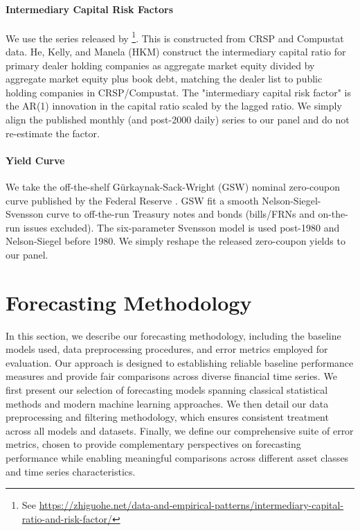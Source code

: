 \documentclass{article}
\begin{document}
\paragraph{Intermediary Capital Risk Factors}
We use the series released by \citet{He2017}\footnote{See \url{https://zhiguohe.net/data-and-empirical-patterns/intermediary-capital-ratio-and-risk-factor/}}. This is constructed from CRSP and Compustat data.
He, Kelly, and Manela (HKM) construct the intermediary capital ratio for primary dealer holding companies as aggregate market equity divided by aggregate market equity plus book debt, matching the dealer list to public holding companies in CRSP/Compustat. The "intermediary capital risk factor" is the AR(1) innovation in the capital ratio scaled by the lagged ratio. We simply align the published monthly (and post-2000 daily) series to our panel and do not re-estimate the factor.


\paragraph{Yield Curve}
We take the off-the-shelf Gürkaynak-Sack-Wright (GSW) nominal zero-coupon curve published by the Federal Reserve \citep{Gurkaynak2007}. GSW fit a smooth Nelson-Siegel-Svensson curve to off-the-run Treasury notes and bonds (bills/FRNs and on-the-run issues excluded). The six-parameter Svensson model is used post-1980 and Nelson-Siegel before 1980. We simply reshape the released zero-coupon yields to our panel. 


\section{Forecasting Methodology}
\label{sec:methodology}


In this section, we describe our forecasting methodology, including the baseline models used, data preprocessing procedures, and error metrics employed for evaluation. Our approach is designed to establishing reliable baseline performance measures and provide fair comparisons across diverse financial time series. We first present our selection of forecasting models spanning classical statistical methods and modern machine learning approaches. We then detail our data preprocessing and filtering methodology, which ensures consistent treatment across all models and datasets. Finally, we define our comprehensive suite of error metrics, chosen to provide complementary perspectives on forecasting performance while enabling meaningful comparisons across different asset classes and time series characteristics.
\end{document}
